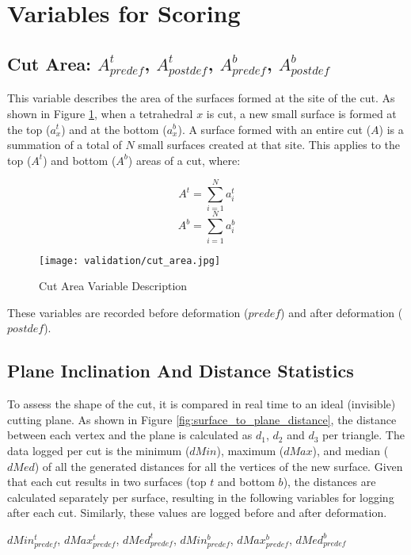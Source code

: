 \section{Variables for Scoring}

\subsection{Cut Area: $A^t_{predef}$, $A^t_{postdef}$, $A^b_{predef}$, $A^b_{postdef}$}
\label{para:data_cut_area}

This variable describes the area of the surfaces formed at the site of the cut. As shown in Figure \ref{fig:cut_area}, when a tetrahedral $x$ is cut, a new small surface is formed at the top ($a^t_x$) and at the bottom ($a^b_x$). A surface formed with an entire cut ($A$) is a summation of a total of $N$ small surfaces created at that site. This applies to the top ($A^t$) and bottom ($A^b$) areas of a cut, where:

\[ A^t = \sum_{i=1}^{N}a^t_i \]
\[ A^b = \sum_{i=1}^{N}a^b_i \]

\begin{figure}
  \centering%
  \texttt{[image: validation/cut\_area.jpg]}
  \caption{Cut Area Variable Description}\label{fig:cut_area}
\end{figure}

These variables are recorded before deformation ($predef$) and after deformation ($postdef$).

\subsection{Plane Inclination And Distance Statistics}\label{para:data_plane_inclination_and_distance}

To assess the shape of the cut, it is compared in real time to an ideal (invisible) cutting plane. As shown in Figure \ref{fig:surface_to_plane_distance}, the distance between each vertex and the plane is calculated as $d_1$, $d_2$ and $d_3$ per triangle. The data logged per cut is the minimum ($dMin$), maximum ($dMax$), and median ($dMed$) of all the generated distances for all the vertices of the new surface. Given that each cut results in two surfaces (top $t$ and bottom $b$), the distances are calculated separately per surface, resulting in the following variables for logging after each cut. Similarly, these values are logged before and after deformation.

\hfill

$dMin_{predef}^t$, $dMax_{predef}^t$, $dMed_{predef}^t$, $dMin_{predef}^b$, $dMax_{predef}^b$, $dMed_{predef}^b$

